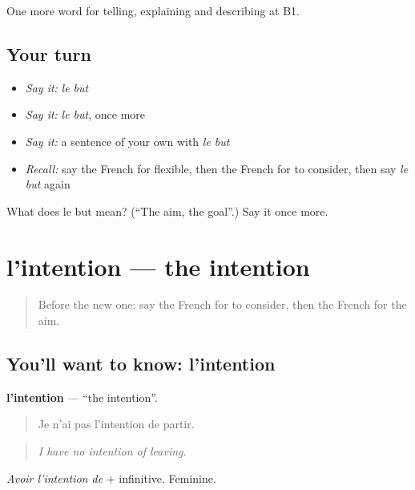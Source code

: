 \begin{grammarlens}[title={What you've built}]
One more word for telling, explaining and describing at B1.
\end{grammarlens}

\subsection*{Your turn}
\begin{itemize}
\raggedright
  \item \emph{Say it:} \emph{le but}
  \item \emph{Say it:} \emph{le but}, once more
  \item \emph{Say it:} a sentence of your own with \emph{le but}
  \item \emph{Recall:} say the French for flexible, then the French for to consider, then say \emph{le but} again
\end{itemize}

\begin{tcolorbox}[breakable,colback=teal!4,colframe=teal!35!black,title={Before you move on}]
What does le but mean? (\textquotedblleft{}The aim, the goal\textquotedblright{}.) Say it once more.
\end{tcolorbox}
\section[l'intention]{l'intention — the intention}

\label{lesson:FR-C374-intention}



\begin{quote}
Before the new one: say the French for to consider, then the French for the aim.
\end{quote}

\subsection*{You'll want to know: l'intention}
\textbf{l'intention} — \textquotedblleft{}the intention\textquotedblright{}.

\begin{quote}
Je n'ai pas l'intention de partir.
\end{quote}

\begin{quote}
\emph{I have no intention of leaving.}
\end{quote}

\emph{Avoir l'intention de} + infinitive. Feminine.

